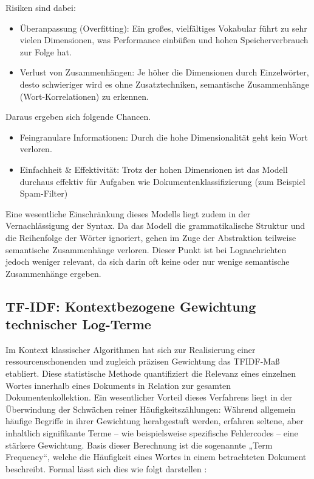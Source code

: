 Risiken sind dabei:
\begin{itemize}
    \item Überanpassung (Overfitting): Ein großes, vielfältiges Vokabular führt zu sehr vielen Dimensionen, was Performance einbüßen und hohen Speicherverbrauch zur Folge hat.
    \item Verlust von Zusammenhängen: Je höher die Dimensionen durch Einzelwörter, desto schwieriger wird es ohne Zusatztechniken, semantische Zusammenhänge (Wort-Korrelationen) zu erkennen.
\end{itemize}

Daraus ergeben sich folgende Chancen. 
\begin{itemize}
    \item Feingranulare Informationen: Durch die hohe Dimensionalität geht kein Wort verloren.
    \item Einfachheit \& Effektivität: Trotz der hohen Dimensionen ist das Modell durchaus effektiv für Aufgaben wie Dokumentenklassifizierung (zum Beispiel Spam-Filter)
\end{itemize}
Eine wesentliche Einschränkung dieses Modells liegt zudem in der Vernachlässigung der Syntax. Da das Modell die grammatikalische Struktur und die Reihenfolge der Wörter ignoriert, gehen im Zuge der Abstraktion teilweise semantische Zusammenhänge verloren. Dieser Punkt ist bei Lognachrichten jedoch weniger relevant, da sich darin oft keine oder nur wenige semantische Zusammenhänge ergeben. 

\subsection{TF-IDF: Kontextbezogene Gewichtung technischer Log-Terme}


Im Kontext klassischer Algorithmen hat sich zur Realisierung einer ressourcenschonenden und zugleich präzisen Gewichtung das \ac{TFIDF}-Maß etabliert. Diese statistische Methode quantifiziert die Relevanz eines einzelnen Wortes innerhalb eines Dokuments in Relation zur gesamten Dokumentenkollektion. Ein wesentlicher Vorteil dieses Verfahrens liegt in der Überwindung der Schwächen reiner Häufigkeitszählungen: Während allgemein häufige Begriffe in ihrer Gewichtung herabgestuft werden, erfahren seltene, aber inhaltlich signifikante Terme – wie beispielsweise spezifische Fehlercodes – eine stärkere Gewichtung. Basis dieser Berechnung ist die sogenannte „Term Frequency“, welche die Häufigkeit eines Wortes in einem betrachteten Dokument beschreibt. Formal lässt sich dies wie folgt darstellen \cite[Kap.~11]{jm3}:

